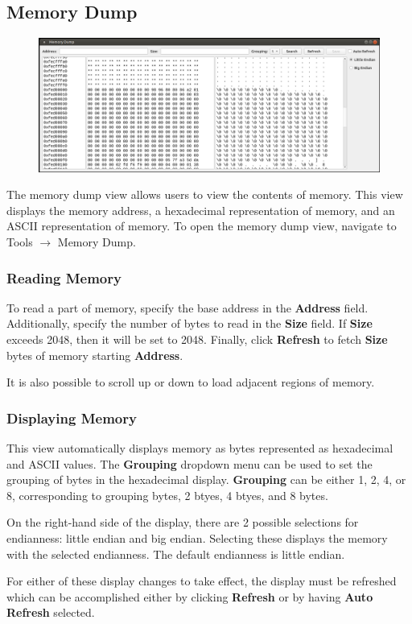 \documentclass{article}
\begin{document}
\subsection{Memory Dump}
\begin{figure}[h]
    \centering
    \includegraphics[width=\linewidth]{images/MemDump.PNG}
    \label{fig:memdump}
\end{figure}

The memory dump view allows users to view the contents of memory. This view displays the memory address, a hexadecimal representation of memory, and an ASCII representation of memory. To open the memory dump view, navigate to Tools $\rightarrow$ Memory Dump.

\subsubsection{Reading Memory}
To read a part of memory, specify the base address in the \textbf{Address} field. Additionally, specify the number of bytes to read in the \textbf{Size} field. If \textbf{Size} exceeds 2048, then it will be set to 2048. Finally, click \textbf{Refresh} to fetch \textbf{Size} bytes of memory starting \textbf{Address}.\par 
It is also possible to scroll up or down to load adjacent regions of memory. 

\subsubsection{Displaying Memory}\label{ReadMem}
This view automatically displays memory as bytes represented as hexadecimal and ASCII values. The \textbf{Grouping} dropdown menu can be used to set the grouping of bytes in the hexadecimal display. \textbf{Grouping} can be either 1, 2, 4, or 8, corresponding to grouping bytes, 2 btyes, 4 btyes, and 8 bytes. \par
On the right-hand side of the display, there are 2 possible selections for endianness: little endian and big endian. Selecting these displays the memory with the selected endianness. The default endianness is little endian. \par
For either of these display changes to take effect, the display must be refreshed which can be accomplished either by clicking \textbf{Refresh} or by having \textbf{Auto Refresh} selected.
\end{document}
